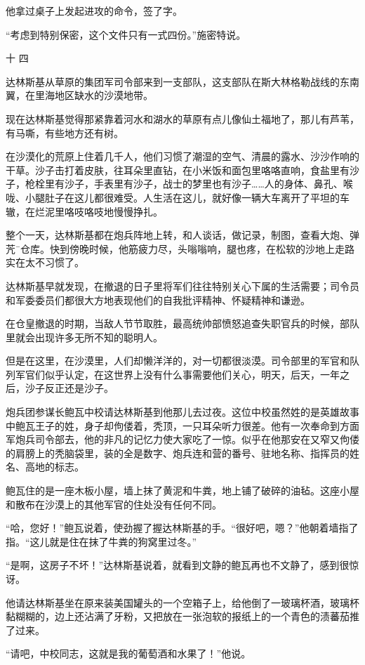 他拿过桌子上发起进攻的命令，签了字。

“考虑到特别保密，这个文件只有一式四份。”施密特说。

十 四

达林斯基从草原的集团军司令部来到一支部队，这支部队在斯大林格勒战线的东南翼，在里海地区缺水的沙漠地带。

现在达林斯基觉得那紧靠着河水和湖水的草原有点儿像仙土福地了，那儿有芦苇，有马嘶，有些地方还有树。

在沙漠化的荒原上住着几千人，他们习惯了潮湿的空气、清晨的露水、沙沙作响的干草。沙子击打着皮肤，往耳朵里直钻，在小米饭和面包里咯咯直响，食盐里有沙子，枪栓里有沙子，手表里有沙子，战士的梦里也有沙子……人的身体、鼻孔、喉咙、小腿肚子在这儿都很难受。人生活在这儿，就好像一辆大车离开了平坦的车辙，在烂泥里咯吱咯吱地慢慢挣扎。

整个一天，达林斯基都在炮兵阵地上转，和人谈话，做记录，制图，查看大炮、弹苀¯仓库。快到傍晚时候，他筋疲力尽，头嗡嗡响，腿也疼，在松软的沙地上走路实在太不习惯了。

达林斯基早就发现，在撤退的日子里将军们往往特别关心下属的生活需要；司令员和军委委员们都很大方地表现他们的自我批评精神、怀疑精神和谦逊。

在仓皇撤退的时期，当敌人节节取胜，最高统帅部愤怒追查失职官兵的时候，部队里就会出现许多无所不知的聪明人。

但是在这里，在沙漠里，人们却懒洋洋的，对一切都很淡漠。司令部里的军官和队列军官们似乎认定，在这世界上没有什么事需要他们关心，明天，后天，一年之后，沙子反正还是沙子。

炮兵团参谋长鲍瓦中校请达林斯基到他那儿去过夜。这位中校虽然姓的是英雄故事中鲍瓦王子的姓，身子却佝偻着，秃顶，一只耳朵听力很差。他有一次奉命到方面军炮兵司令部去，他的非凡的记忆力使大家吃了一惊。似乎在他那安在又窄又佝偻的肩膀上的秃脑袋里，装的全是数字、炮兵连和营的番号、驻地名称、指挥员的姓名、高地的标志。

鲍瓦住的是一座木板小屋，墙上抹了黄泥和牛粪，地上铺了破碎的油毡。这座小屋和散布在沙漠上的其他军官的住处没有任何不同。

“哈，您好！”鲍瓦说着，使劲握了握达林斯基的手。“很好吧，嗯？”他朝着墙指了指。“这儿就是住在抹了牛粪的狗窝里过冬。”

“是啊，这房子不坏！”达林斯基说着，就看到文静的鲍瓦再也不文静了，感到很惊讶。

他请达林斯基坐在原来装美国罐头的一个空箱子上，给他倒了一玻璃杯酒，玻璃杯黏糊糊的，边上还沾满了牙粉，又把放在一张泡软的报纸上的一个青色的渍蕃茄推了过来。

“请吧，中校同志，这就是我的葡萄酒和水果了！”他说。

